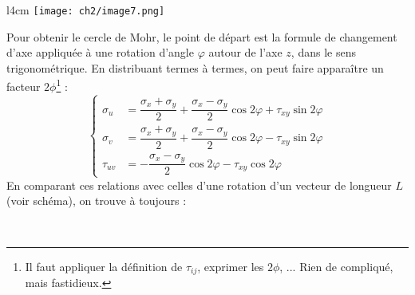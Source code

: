     \begin{wrapfigure}[7]{l}{4cm}
    \texttt{[image: ch2/image7.png]}
    \end{wrapfigure}
    Pour obtenir le cercle de Mohr, le point de départ est la formule de changement d'axe appliquée à une
    rotation d'angle $\varphi$ autour de l'axe $z$, dans le sens trigonométrique. En distribuant termes à
    termes, on peut faire apparaître un facteur $2\phi$\footnote{Il faut appliquer la définition de 
    $\tau_{ij}$, exprimer les $2\phi$, ... Rien de compliqué, mais fastidieux.} :
    \begin{equation}
    \left\{\begin{array}{ll}
    \sigma_u &=  \dfrac{\sigma_x+\sigma_y}{2} + \dfrac{\sigma_x-\sigma_y}{2}\cos 2\varphi + \tau_{xy}\sin
    2\varphi\\
    \sigma_v &=  \dfrac{\sigma_x+\sigma_y}{2} + \dfrac{\sigma_x-\sigma_y}{2}\cos 2\varphi - \tau_{xy}\sin
    2\varphi\\
    \tau_{uv} &= -\dfrac{\sigma_x-\sigma_y}{2}\cos 2\varphi - \tau_{xy}\cos 2\varphi
    \end{array}\right.
    \end{equation}
    En comparant ces relations avec celles d'une rotation d'un vecteur de longueur $L$ (voir schéma), on
    trouve à toujours :
    
    \ \\
    
